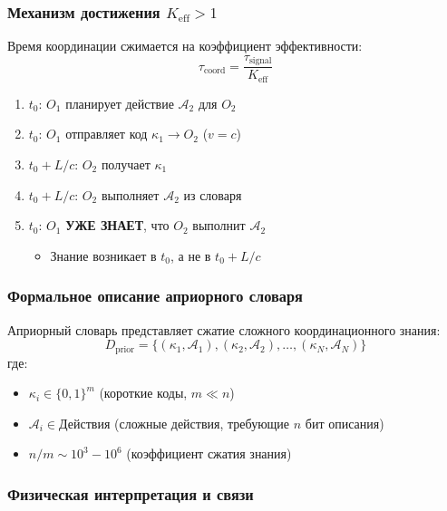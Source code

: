 \documentclass[11pt,a4paper]{article}
\begin{document}
	\subsubsection{Механизм достижения $K_{\mathrm{eff}} > 1$}
	
	Время координации сжимается на коэффициент эффективности:
	\begin{equation}
		\tau_{\text{coord}} = \frac{\tau_{\text{signal}}}{K_{\mathrm{eff}}}
	\end{equation}
	
	\begin{enumerate}[label=\arabic*.]
		\item $t_0$: $O_1$ планирует действие $\mathcal{A}_2$ для $O_2$
		\item $t_0$: $O_1$ отправляет код $\kappa_1 \to O_2$ ($v = c$)
		\item $t_0 + L/c$: $O_2$ получает $\kappa_1$
		\item $t_0 + L/c$: $O_2$ выполняет $\mathcal{A}_2$ из словаря
		\item $t_0$: $O_1$ \textbf{УЖЕ ЗНАЕТ}, что $O_2$ выполнит $\mathcal{A}_2$
		\begin{itemize}
			\item Знание возникает в $t_0$, а не в $t_0 + L/c$
		\end{itemize}
	\end{enumerate}
	
	\subsubsection{Формальное описание априорного словаря}
	
	Априорный словарь представляет сжатие сложного координационного знания:
	\begin{equation}
		D_{\text{prior}} = \{(\kappa_1, \mathcal{A}_1), (\kappa_2, \mathcal{A}_2), \dots, (\kappa_N, \mathcal{A}_N)\}
	\end{equation}
	где:
	\begin{itemize}
		\item $\kappa_i \in \{0,1\}^m$ (короткие коды, $m \ll n$)
		\item $\mathcal{A}_i \in \text{Действия}$ (сложные действия, требующие $n$ бит описания)
		\item $n/m \sim 10^3-10^6$ (коэффициент сжатия знания)
	\end{itemize}
	
	\subsubsection{Физическая интерпретация и связи}
	
\end{document}
